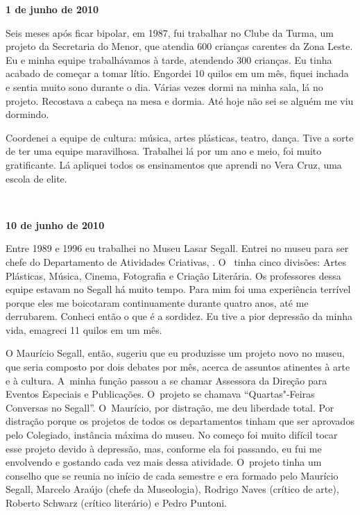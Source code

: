 \begin{flushright}\textbf{1 de junho de 2010}\end{flushright}


Seis meses após ficar bipolar, em 1987, fui trabalhar no Clube da Turma,
um projeto da Secretaria do Menor, que atendia 600 crianças carentes da
Zona Leste. Eu e minha equipe trabalhávamos à tarde, atendendo 300
crianças. Eu tinha acabado de começar a tomar lítio. Engordei 10 quilos
em um mês, fiquei inchada e sentia muito sono durante o dia. Várias
vezes dormi na minha sala, lá no projeto. Recostava a cabeça na mesa e
dormia. Até hoje não sei se alguém me viu dormindo.

Coordenei a equipe de cultura: música, artes plásticas, teatro, dança.
Tive a sorte de ter uma equipe maravilhosa. Trabalhei lá por um ano e
meio, foi muito gratificante. Lá apliquei todos os ensinamentos que
aprendi no Vera Cruz, uma escola de elite.

\begin{center}\asterisc{}​\end{center}


\begin{flushright}\textbf{10 de junho de 2010}\end{flushright}


Entre 1989 e 1996 eu trabalhei no Museu Lasar Segall. Entrei no museu
para ser chefe do Departamento de Atividades Criativas, . O~ tinha
cinco divisões: Artes Plásticas, Música, Cinema, Fotografia e Criação
Literária. Os professores dessa equipe estavam no Segall há muito tempo.
Para mim foi uma experiência terrível porque eles me boicotaram
continuamente durante quatro anos, até me derrubarem. Conheci então o
que é a sordidez. Eu tive a pior depressão da minha vida, emagreci 11
quilos em um mês.

O Maurício Segall, então, sugeriu que eu produzisse um projeto novo no
museu, que seria composto por dois debates por mês, acerca de assuntos
atinentes à arte e à cultura. A~minha função passou a se chamar
Assessora da Direção para Eventos Especiais e Publicações. O~projeto se
chamava ``Quartas"-Feiras Conversas no Segall''. O~Maurício, por
distração, me deu liberdade total. Por distração porque os projetos de
todos os departamentos tinham que ser aprovados pelo Colegiado,
instância máxima do museu. No começo foi muito difícil tocar esse
projeto devido à depressão, mas, conforme ela foi passando, eu fui me
envolvendo e gostando cada vez mais dessa atividade. O~projeto tinha um
conselho que se reunia no início de cada semestre e era formado pelo
Maurício Segall, Marcelo Araújo (chefe da Museologia), Rodrigo Naves
(crítico de arte), Roberto Schwarz (crítico literário) e Pedro Puntoni.

